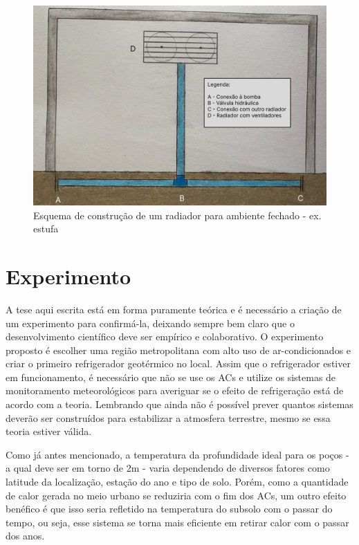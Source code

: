 \begin{figure}[htp]
    \centering
    \includegraphics[scale=0.25]{pictures/estufa.png}
    \caption{Esquema de construção de um radiador para ambiente fechado - ex. estufa}
    \label{estufa}
\end{figure}

\section{Experimento}

A tese aqui escrita está em forma puramente teórica e é necessário a criação de um experimento para confirmá-la, deixando sempre bem claro que o desenvolvimento científico deve ser empírico e colaborativo. O experimento proposto é escolher uma região metropolitana com alto uso de ar-condicionados e criar o primeiro refrigerador geotérmico no local. Assim que o refrigerador estiver em funcionamento, é necessário que não se use os ACs e utilize os sistemas de monitoramento meteorológicos para averiguar se o efeito de refrigeração está de acordo com a teoria. Lembrando que ainda não é possível prever quantos sistemas deverão ser construídos para estabilizar a atmosfera terrestre, mesmo se essa teoria estiver válida.

Como já antes mencionado, a temperatura da profundidade ideal para os poços - a qual deve ser em torno de 2m - varia dependendo de diversos fatores como latitude da localização, estação do ano e tipo de solo. Porém, como a quantidade de calor gerada no meio urbano se reduziria com o fim dos ACs, um outro efeito benéfico é que isso seria refletido na temperatura do subsolo com o passar do tempo, ou seja, esse sistema se torna mais eficiente em retirar calor com o passar dos anos.